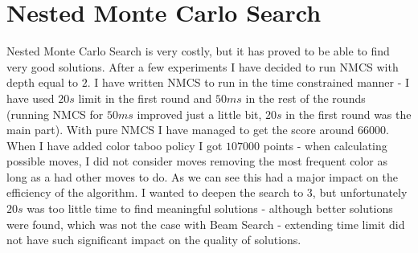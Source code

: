 \documentclass[11pt]{article}
\begin{document}
	\section{Nested Monte Carlo Search}
	Nested Monte Carlo Search is very costly, but it has proved to be able to find very good solutions. After a few experiments I have decided to run NMCS with depth equal to $2$. I have written NMCS to run in the time constrained manner - I have used $20s$ limit in the first round and $50ms$ in the rest of the rounds (running NMCS for $50ms$ improved just a little bit, $20s$ in the first round was the main part). With pure NMCS I have managed to get the score around $66000$. When I have added color taboo policy I got $107000$ points - when calculating possible moves, I did not consider moves removing the most frequent color as long as a had other moves to do. As we can see this had a major impact on the efficiency of the algorithm. I wanted to deepen the search to $3$, but unfortunately $20s$ was too little time to find meaningful solutions - although better solutions were found, which was not the case with Beam Search - extending time limit did not have such significant impact on the quality of solutions.
	
\end{document}
